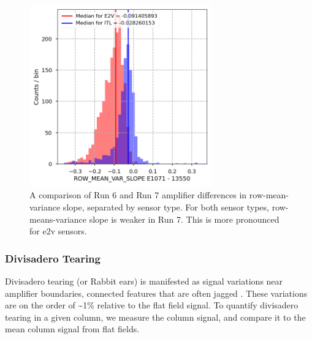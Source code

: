 \begin{figure}[ht]
\begin{centering}
\includegraphics[width=0.7\textwidth]{figures/baselineCharacterization/ROW_MEAN_VAR_SLOPE_13550_E1071_diff.png}
\caption{A comparison of Run 6 and Run 7 amplifier differences in row-mean-variance slope, separated by sensor type. For both sensor types, row-means-variance slope is weaker in Run 7. This is more pronounced for e2v sensors.}
\end{centering}
\end{figure}

\subsubsection{Divisadero Tearing}

Divisadero tearing (or Rabbit ears) is manifested as signal variations near amplifier boundaries, connected features that are often jagged \cite{2020arXiv200209439J,2024SPIE13103E..0WU}. These variations are on the order of \textasciitilde1\% relative to the flat field signal. To quantify divisadero tearing in a given column, we measure the column signal, and compare it to the mean column signal from flat fields.

